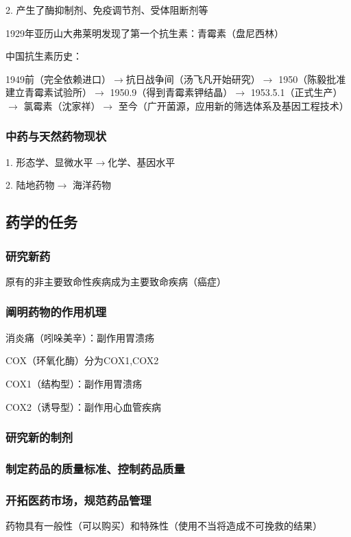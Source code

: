 2. 产生了酶抑制剂、免疫调节剂、受体阻断剂等
\begin{notation}
    1929年亚历山大弗莱明发现了第一个抗生素：青霉素（盘尼西林）

    中国抗生素历史：

    1949前（完全依赖进口）$\to $抗日战争间（汤飞凡开始研究）$\to $ 1950（陈毅批准建立青霉素试验所）$\to $ 1950.9（得到青霉素钾结晶）$\to $ 1953.5.1（正式生产）$\to $ 氯霉素（沈家祥）$\to $ 至今（广开菌源，应用新的筛选体系及基因工程技术）
\end{notation}

\subsubsection*{中药与天然药物现状}%
\label{subsub:中药与天然药物现状}
1. 形态学、显微水平$\to$化学、基因水平

2. 陆地药物$\to $ 海洋药物
\subsection{药学的任务}%
\label{sub:药学的任务}
\subsubsection*{研究新药}%
\label{subsub:研究新药}
原有的非主要致命性疾病成为主要致命疾病（癌症）

\subsubsection*{阐明药物的作用机理}%
\label{subsub:阐明药物的作用机理}
\begin{eg}
    消炎痛（吲哚美辛）：副作用胃溃疡

    COX（环氧化酶）分为COX1,COX2

    COX1（结构型）：副作用胃溃疡

    COX2（诱导型）：副作用心血管疾病
\end{eg}
\subsubsection*{研究新的制剂}%
\label{subsub:研究新的制剂}
\subsubsection*{制定药品的质量标准、控制药品质量}%
\label{subsub:制定药品的质量标准、控制药品质量}
\subsubsection*{开拓医药市场，规范药品管理}%
\label{subsub:开拓医药市场，规范药品管理}
药物具有一般性（可以购买）和特殊性（使用不当将造成不可挽救的结果）

